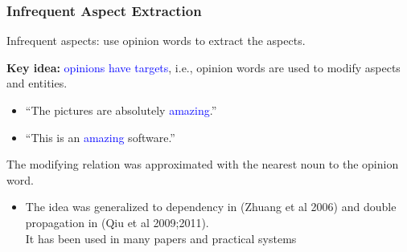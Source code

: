 \documentclass[t]{beamer}
\begin{document}
\begin{frame} \frametitle{Infrequent Aspect Extraction} %

Infrequent aspects: use opinion words to extract the aspects. 

\textbf{Key idea:} \textcolor{blue}{opinions have targets}, i.e., opinion words are used to modify aspects and entities.
 \begin{itemize}
\item ``The pictures are absolutely \textcolor{blue}{amazing}.'' 
\item ``This is an \textcolor{blue}{amazing} software.''
\end{itemize}

The modifying relation was approximated with the nearest noun to the
opinion word. 
\begin{itemize}
\item The idea was generalized to dependency in (Zhuang et al 2006) and
double propagation in (Qiu et al 2009;2011). \\
It has been used in many papers and practical systems
\end{itemize}

\end{frame}
\end{document}
